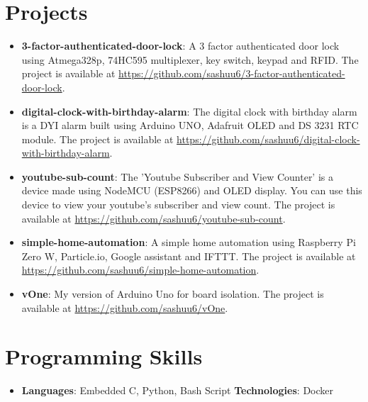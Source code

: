 \documentclass[letterpaper,11pt]{article}
\newcommand{\resumeItem}[2]{
  \item\small{
    \textbf{#1}{: #2 \vspace{-2pt}}
  }
}
\newcommand{\resumeSubItem}[2]{\resumeItem{#1}{#2}\vspace{-4pt}}
\newcommand{\resumeSubHeadingListStart}{\begin{itemize}[leftmargin=*]}
\newcommand{\resumeSubHeadingListEnd}{\end{itemize}}
\begin{document}
\section{Projects}
  \resumeSubHeadingListStart
    \resumeSubItem{3-factor-authenticated-door-lock}
      { A 3 factor authenticated door lock using Atmega328p, 74HC595 multiplexer, key switch, keypad and RFID. The project is available at \url{https://github.com/sashuu6/3-factor-authenticated-door-lock}.}
    \resumeSubItem{digital-clock-with-birthday-alarm}
      {The digital clock with birthday alarm is a DYI alarm built using Arduino UNO, Adafruit OLED and DS 3231 RTC module. The project is available at \url{https://github.com/sashuu6/digital-clock-with-birthday-alarm}.}
    \resumeSubItem{youtube-sub-count}
      {The 'Youtube Subscriber and View Counter' is a device made using NodeMCU (ESP8266) and OLED display. You can use this device to view your youtube's subscriber and view count. The project is available at \url{https://github.com/sashuu6/youtube-sub-count}.}
    \resumeSubItem{simple-home-automation}
      {A simple home automation using Raspberry Pi Zero W, Particle.io, Google assistant and IFTTT. The project is available at \url{https://github.com/sashuu6/simple-home-automation}.}
      \resumeSubItem{vOne}
      {My version of Arduino Uno for board isolation. The project is available at \url{https://github.com/sashuu6/vOne}.}
  \resumeSubHeadingListEnd

\section{Programming Skills}
  \resumeSubHeadingListStart
    \item{
      \textbf{Languages}{: Embedded C, Python, Bash Script}
      \hfill
      \textbf{Technologies}{: Docker}
    }
  \resumeSubHeadingListEnd


\end{document}
